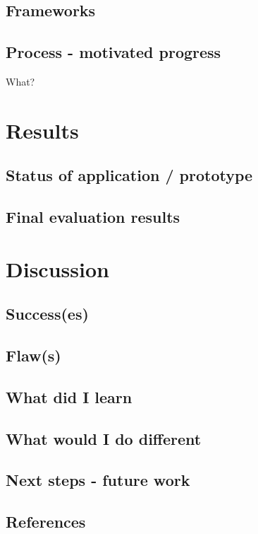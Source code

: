 \documentclass[]{report}
\begin{document}
\section{Frameworks}

\section{Process - motivated progress}

What?

\chapter{Results}

\section{Status of application / prototype}

\section{Final evaluation results}

\chapter{Discussion}

\section{Success(es)}

\section{Flaw(s)}

\section{What did I learn}

\section{What would I do different}

\section{Next steps - future work}

\section{References}
\end{document}
